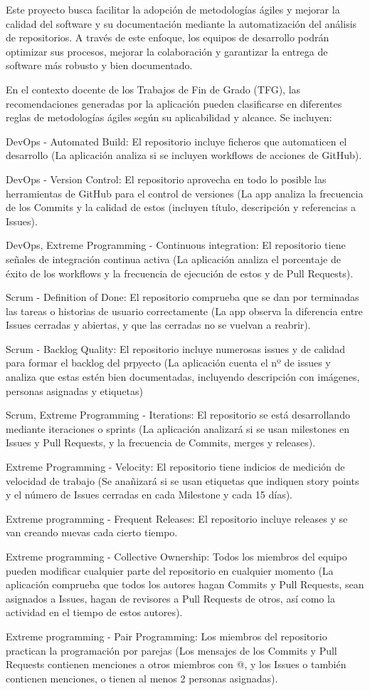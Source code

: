 Este proyecto busca facilitar la adopción de metodologías ágiles y mejorar la calidad del software y su documentación mediante la automatización del análisis de repositorios. A través de este enfoque, los equipos de desarrollo podrán optimizar sus procesos, mejorar la colaboración y garantizar la entrega de software más robusto y bien documentado.

En el contexto docente de los Trabajos de Fin de Grado (TFG), las recomendaciones generadas por la aplicación pueden clasificarse en diferentes reglas de metodologías ágiles según su aplicabilidad y alcance. Se incluyen:

DevOps - Automated Build: El repositorio incluye ficheros que automaticen el desarrollo (La aplicación analiza si se incluyen workflows de acciones de GitHub).

DevOps - Version Control: El repositorio aprovecha en todo lo posible las herramientas de GitHub para el control de versiones (La app analiza la frecuencia de los Commits y la calidad de estos (incluyen título, descripción y referencias a Issues).

DevOps, Extreme Programming - Continuous integration: El repositorio tiene señales de integración continua activa (La aplicación analiza el porcentaje de éxito de los workflows y la frecuencia de ejecución de estos y de Pull Requests).

Scrum - Definition of Done: El repositorio comprueba que se dan por terminadas las tareas o historias de usuario correctamente (La app observa la diferencia entre Issues cerradas y abiertas, y que las cerradas no se vuelvan a reabrir).

Scrum - Backlog Quality: El repositorio incluye numerosas issues y de calidad para formar el backlog del prpyecto (La aplicación cuenta el nº de issues y analiza que estas estén bien documentadas, incluyendo descripción con imágenes, personas asignadas y etiquetas)

Scrum, Extreme Programming - Iterations: El repositorio se está desarrollando mediante iteraciones o sprints (La aplicación analizará si se usan milestones en Issues y Pull Requests, y la frecuencia de Commits, merges y releases).

Extreme Programming - Velocity: El repositorio tiene indicios de medición de velocidad de trabajo (Se anañizará si se usan etiquetas que indiquen story points y el número de Issues cerradas en cada Milestone y cada 15 días).

Extreme programming - Frequent Releases: El repositorio incluye releases y se van creando nuevas cada cierto tiempo.

Extreme programming - Collective Ownership: Todos los miembros del equipo pueden modificar cualquier parte del repositorio en cualquier momento (La aplicación comprueba que todos los autores hagan Commits y Pull Requests, sean asignados a Issues, hagan de revisores a Pull Requests de otros, así como la actividad en el tiempo de estos autores).

Extreme programming - Pair Programming: Los miembros del repositorio practican la programación por parejas (Los mensajes de los Commits y Pull Requests contienen menciones a otros miembros con @, y los Issues o también contienen menciones, o tienen al menos 2 personas asignadas).